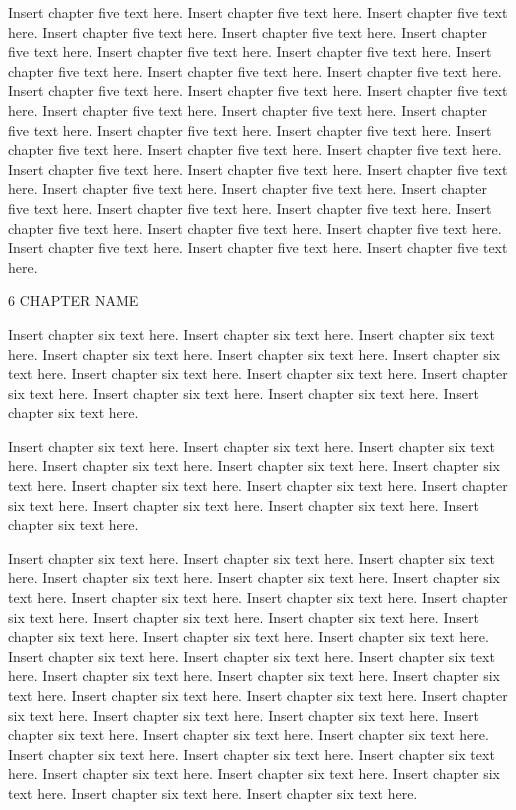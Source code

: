 Insert chapter five text here. Insert chapter five text here. Insert chapter five text here. Insert chapter five text here. Insert chapter five text here. Insert chapter five text here. Insert chapter five text here. Insert chapter five text here. Insert chapter five text here. Insert chapter five text here. Insert chapter five text here. Insert chapter five text here. Insert chapter five text here. Insert chapter five text here. Insert chapter five text here. Insert chapter five text here. Insert chapter five text here. Insert chapter five text here. Insert chapter five text here. Insert chapter five text here. Insert chapter five text here. Insert chapter five text here. Insert chapter five text here. Insert chapter five text here. Insert chapter five text here. Insert chapter five text here. Insert chapter five text here. Insert chapter five text here. Insert chapter five text here. Insert chapter five text here. Insert chapter five text here. Insert chapter five text here. Insert chapter five text here. Insert chapter five text here. Insert chapter five text here. Insert chapter five text here.

6 CHAPTER NAME

Insert chapter six text here. Insert chapter six text here. Insert chapter six text here. Insert chapter six text here. Insert chapter six text here. Insert chapter six text here. Insert chapter six text here. Insert chapter six text here. Insert chapter six text here. Insert chapter six text here. Insert chapter six text here. Insert chapter six text here.

Insert chapter six text here. Insert chapter six text here. Insert chapter six text here. Insert chapter six text here. Insert chapter six text here. Insert chapter six text here. Insert chapter six text here. Insert chapter six text here. Insert chapter six text here. Insert chapter six text here. Insert chapter six text here. Insert chapter six text here.

Insert chapter six text here. Insert chapter six text here. Insert chapter six text here. Insert chapter six text here. Insert chapter six text here. Insert chapter six text here. Insert chapter six text here. Insert chapter six text here. Insert chapter six text here. Insert chapter six text here. Insert chapter six text here. Insert chapter six text here. Insert chapter six text here. Insert chapter six text here. Insert chapter six text here. Insert chapter six text here. Insert chapter six text here. Insert chapter six text here. Insert chapter six text here. Insert chapter six text here. Insert chapter six text here. Insert chapter six text here. Insert chapter six text here. Insert chapter six text here. Insert chapter six text here. Insert chapter six text here. Insert chapter six text here. Insert chapter six text here. Insert chapter six text here. Insert chapter six text here. Insert chapter six text here. Insert chapter six text here. Insert chapter six text here. Insert chapter six text here. Insert chapter six text here. Insert chapter six text here.


